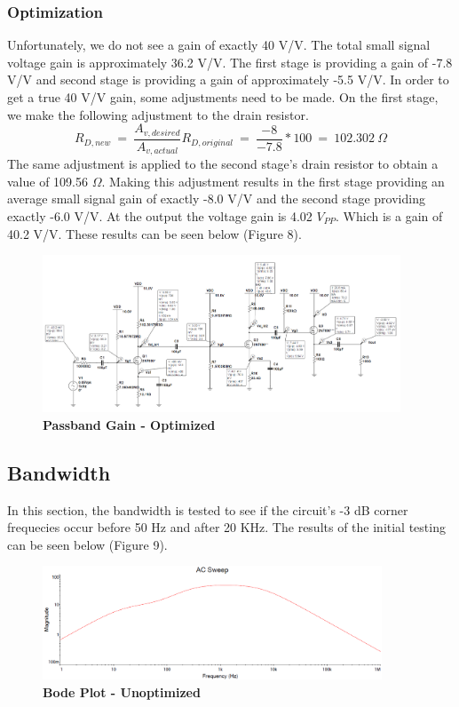 \documentclass{article}
\begin{document}
\subsubsection{Optimization}
Unfortunately, we do not see a gain of exactly 40 V/V. The total small signal voltage gain is approximately 36.2 V/V. The first stage is providing a gain of -7.8 V/V and second stage is providing a gain of approximately -5.5 V/V. In order to get a true 40 V/V gain, some adjustments need to be made. On the first stage, we make the following adjustment to the drain resistor. $$R_{D,new}\ =\ \frac{A_{v,desired}}{A_{v,actual}}R_{D,original}\ =\ \frac{-8}{-7.8}*100\ =\ 102.302\ \Omega$$
The same adjustment is applied to the second stage's drain resistor to obtain a value of 109.56 $\Omega$. Making this adjustment results in the first stage providing an average small signal gain of exactly -8.0 V/V and the second stage providing exactly -6.0 V/V. At the output the voltage gain is 4.02 $V_{PP}$. Which is a gain  of 40.2 V/V. These results can be seen below (Figure 8).
    \begin{figure}[H]
        \centerline{\includegraphics[width=0.95\textwidth]{pass_band_gain_opt_img}}
        \caption{\textbf{Passband Gain - Optimized}}
	\end{figure}
\subsection{Bandwidth}
In this section, the bandwidth is tested to see if the circuit's -3 dB corner frequecies occur before 50 Hz and after 20 KHz. The results of the initial testing can be seen below (Figure 9).
    \begin{figure}[H]
        \centerline{\includegraphics[width=0.9\textwidth]{bode_unopt_img}}
        \caption{\textbf{Bode Plot - Unoptimized}}
	\end{figure}
\end{document}
